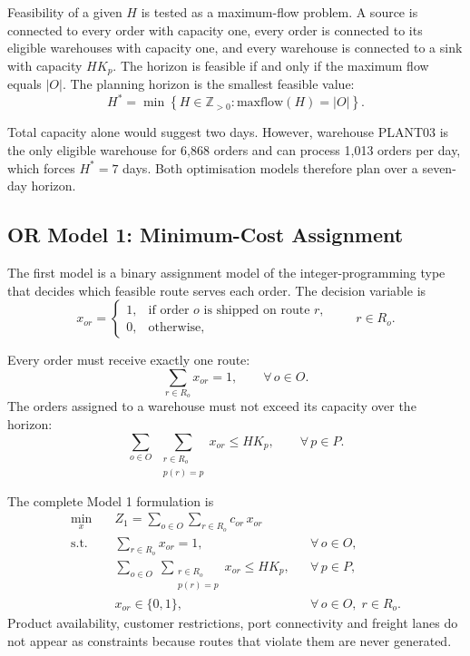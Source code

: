 \documentclass[conference]{IEEEtran}
\begin{document}
Feasibility of a given $H$ is tested as a maximum-flow problem. A source is connected to every order with capacity one, every order is connected to its eligible warehouses with capacity one, and every warehouse is connected to a sink with capacity $H K_p$. The horizon is feasible if and only if the maximum flow equals $|O|$. The planning horizon is the smallest feasible value:
\begin{equation}
H^{*} = \min \left\{ H \in \mathbb{Z}_{>0} : \text{maxflow}(H) = |O| \right\}.
\end{equation}

Total capacity alone would suggest two days. However, warehouse PLANT03 is the only eligible warehouse for 6,868 orders and can process 1,013 orders per day, which forces $H^{*} = 7$ days. Both optimisation models therefore plan over a seven-day horizon.

\subsection{OR Model 1: Minimum-Cost Assignment}
The first model is a binary assignment model of the integer-programming type \cite{taha,hillier} that decides which feasible route serves each order. The decision variable is
\begin{equation}
x_{or} =
\begin{cases}
1, & \text{if order } o \text{ is shipped on route } r,\\
0, & \text{otherwise},
\end{cases}
\qquad r \in R_o .
\end{equation}

Every order must receive exactly one route:
\begin{equation}
\sum_{r \in R_o} x_{or} = 1, \qquad \forall\, o \in O .
\label{eq:demand}
\end{equation}
The orders assigned to a warehouse must not exceed its capacity over the horizon:
\begin{equation}
\sum_{o \in O} \; \sum_{\substack{r \in R_o \\ p(r) = p}} x_{or} \le H K_p, \qquad \forall\, p \in P .
\label{eq:capacity}
\end{equation}

The complete Model 1 formulation is
\begin{equation}
\begin{aligned}
\min_{x} \quad & Z_1 = \sum_{o \in O} \sum_{r \in R_o} c_{or}\, x_{or} \\
\text{s.t.} \quad & \sum_{r \in R_o} x_{or} = 1, && \forall\, o \in O, \\
& \sum_{o \in O} \; \sum_{\substack{r \in R_o \\ p(r) = p}} x_{or} \le H K_p, && \forall\, p \in P, \\
& x_{or} \in \{0, 1\}, && \forall\, o \in O,\; r \in R_o .
\end{aligned}
\label{eq:model1}
\end{equation}
Product availability, customer restrictions, port connectivity and freight lanes do not appear as constraints because routes that violate them are never generated.
\end{document}
